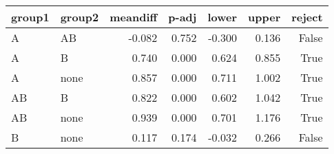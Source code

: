 \begin{tabular}{llrrrrr}
\toprule
group1 & group2 & meandiff & p-adj & lower & upper & reject \\
\midrule
A & AB & -0.082 & 0.752 & -0.300 & 0.136 & False \\
A & B & 0.740 & 0.000 & 0.624 & 0.855 & True \\
A & none & 0.857 & 0.000 & 0.711 & 1.002 & True \\
AB & B & 0.822 & 0.000 & 0.602 & 1.042 & True \\
AB & none & 0.939 & 0.000 & 0.701 & 1.176 & True \\
B & none & 0.117 & 0.174 & -0.032 & 0.266 & False \\
\bottomrule
\end{tabular}
